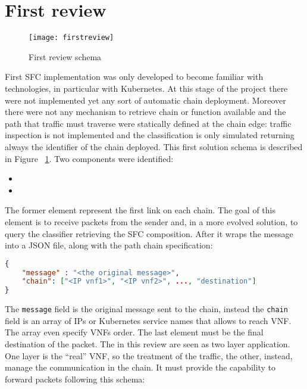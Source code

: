 \section{First review}
\begin{figure}
  \centering
  \texttt{[image: firstreview]}
  \caption{First review schema}
  \label{chap:impl:img:firstreview}
\end{figure}
First SFC implementation was only developed to become familiar with
technologies, in particular with Kubernetes. At this stage of the project there
were not implemented yet any sort of automatic chain deployment. Moreover
there were not any mechanism to retrieve chain or function available and the
path that traffic must traverse were statically defined at the chain edge:
traffic inspection is not implemented and the classification is only simulated
returning always the identifier of the chain deployed. This first solution
schema is described in Figure~ \ref{chap:impl:img:firstreview}. Two components
were identified: \begin{itemize} \item \enchainer
  \item \vnfs
\end{itemize}
The former element represent the first link on each chain. The goal of this
element is to receive packets from the sender and, in a more evolved solution,
to query the classifier retrieving the SFC composition. After it wraps the
message into a JSON file, along with the path chain specification:
\begin{lstlisting}[language=json]
{
    "message" : "<the original message>",
    "chain": ["<IP vnf1>", "<IP vnf2>", ..., "destination"]
}
\end{lstlisting}
The \texttt{message} field is the original message sent to the chain,
instead the \texttt{chain} field is an array of IPs or Kubernetes service names
that allows to reach VNF. The array even specify VNFs order. The last element
must be the final destination of the packet. 
The \vnf{} in this review are seen as two layer application. One layer is
the ``real'' VNF, so the treatment of the traffic, the other, instead, manage
the communication in the chain. It must provide the capability to forward
packets following this schema:
